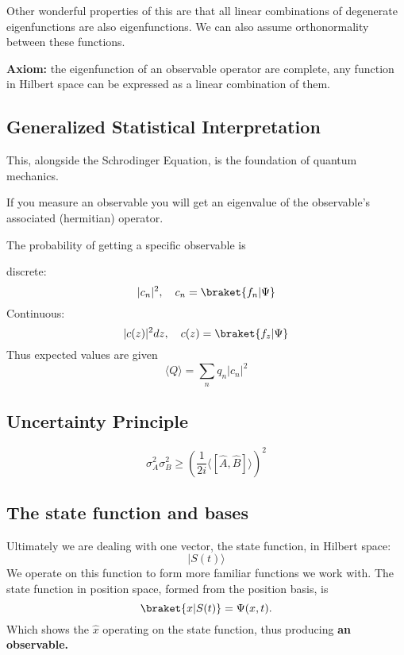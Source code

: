 Other wonderful properties of this are that all linear combinations of degenerate eigenfunctions are also eigenfunctions. We can also assume orthonormality between these functions.

\textbf{Axiom: } the eigenfunction of an observable operator are complete, any function in Hilbert space can be expressed as a linear combination of them.

\subsection{Generalized Statistical Interpretation}
This, alongside the Schrodinger Equation, is the foundation of quantum mechanics.

If you measure an observable you will get an eigenvalue of the observable's associated (hermitian) operator.

The probability of getting a specific observable is

discrete:
\begin{equation}
  |c_{n}|^2,\quad c_{n}=\braket{f_{n}|\Psi}
\end{equation}
Continuous:
\begin{equation}
  |c(z)|^2dz,\quad c(z)=\braket{f_{z}|\Psi}
\end{equation}
Thus expected values are given
\begin{equation}
  \langle Q\rangle=\sum_{n}q_{n}|c_{n}|^2
\end{equation}

\subsection{Uncertainty Principle}
\begin{equation}
  \sigma_{A}^2\sigma_{B}^2\geq(\frac{1}{2i}\langle [\hat{A},\hat{B}]\rangle)^2
\end{equation}

\subsection{The state function and bases}
Ultimately we are dealing with one vector, the state function, in Hilbert space:
\[|S(t)\rangle\] 
We operate on this function to form more familiar functions we work with. The state function in position space, formed from the position basis, is
\[\braket{x|S(t)}=\Psi(x,t).\]
Which shows the $ \hat{x} $ operating on the state function, thus producing \textbf{an observable.}

